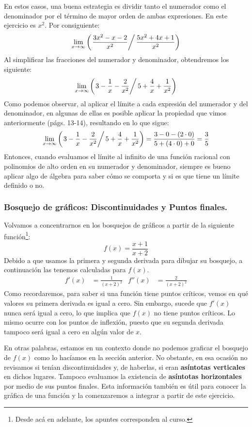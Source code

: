 \documentclass[12pt]{article}
\begin{document}
En estos casos, una buena estrategia es dividir tanto el numerador como el denominador por el término de mayor orden de ambas expresiones. En este ejercicio es $x^{2}$. Por consiguiente:
\[
	\lim_{x \to \infty}
		\left(
			\left. \frac{3x^{2} - x - 2}{x^{2}} \right/
			\frac{5x^{2} + 4x + 1}{x^{2}}
		\right)
\]
Al simplificar las fracciones del numerador y denominador, obtendremos los siguiente:
\[
	\lim_{x \to \infty}
		\left(
			\left. 3 - \frac{1}{x} - \frac{2}{x^{2}} \right/
			5 + \frac{4}{x} + \frac{1}{x^{2}}
		\right)
\]
Como podemos observar, al aplicar el límite a cada expresión del numerador y del denominador, en algunas de ellas es posible aplicar la propiedad que vimos anteriormente (págs. 13-14), resultando en lo que sigue:
\[
	\lim_{x \to \infty}
		\left(
			\left. 3 - \frac{1}{x} - \frac{2}{x^{2}} \right/
			5 + \frac{4}{x} + \frac{1}{x^{2}}
		\right) =
		\frac{3 - 0 - (2 \cdot 0)}{5 + (4 \cdot 0) + 0} =
		\frac{3}{5}
\]
Entonces, cuando evaluamos el límite al infinito de una función racional con polinomios de alto orden en su numerador y denominador, siempre es bueno aplicar algo de álgebra para saber cómo se comporta y si es que tiene un límite definido o no.

\newpage

\subsubsection{Bosquejo de gráficos: Discontinuidades y Puntos finales.}

Volvamos a concentrarnos en los bosquejos de gráficos a partir de la siguiente función\footnote{Desde acá en adelante, los apuntes corresponden al curso.}:
\[
	f(x) = \frac{x + 1}{x + 2}
\]
Debido a que usamos la primera y segunda derivada para dibujar su bosquejo, a continuación las tenemos calculadas para $f(x)$.
\begin{align*}
	f'(x) &= \frac{1}{(x + 2)^{2}} &
	f''(x) &= \frac{2}{(x + 2)^{2}}
\end{align*}
Como recordaremos, para saber si una función tiene puntos críticos, vemos en qué valores su primera derivada es igual a cero. Sin embargo, sucede que $f'(x)$ nunca será igual a cero, lo que implica que $f(x)$ no tiene puntos críticos. Lo mismo ocurre con los puntos de inflexión, puesto que su segunda derivada tampoco será igual a cero en algún valor de $x$.

En otras palabras, estamos en un contexto donde no podemos graficar el bosquejo de $f(x)$ como lo hacíamos en la sección anterior. No obstante, en esa ocasión no revisamos si tenían discontinuidades y, de haberlas, si eran \textbf{asíntotas verticales} en dichos lugares. Tampoco evaluamos la existencia de \textbf{asíntotas horizontales} por medio de sus puntos finales. Esta información también es útil para conocer la gráfica de una función y la comenzaremos a integrar a partir de este ejercicio.
\end{document}
